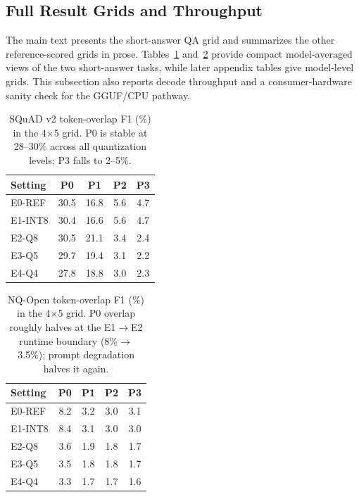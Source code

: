 \documentclass[letterpaper]{article}
\begin{document}
\subsection{Full Result Grids and Throughput}

The main text presents the short-answer QA grid and summarizes the other
reference-scored grids in prose. Tables~\ref{tab:squad_grid}
and~\ref{tab:nq_grid} provide compact model-averaged views of the two
short-answer tasks, while later appendix tables give model-level grids. This
subsection also reports decode throughput and a consumer-hardware sanity check
for the GGUF/CPU pathway.


\begin{table}[t]
  \small\centering
  \caption{SQuAD v2 token-overlap F1 (\%) in the 4$\times$5 grid.
    P0 is stable at 28--30\% across all quantization levels; P3 falls to 2--5\%.}
  \label{tab:squad_grid}
  \begin{tabular}{@{}lcccc@{}}
    \toprule
    Setting & P0 & P1 & P2 & P3 \\
    \midrule
    E0-REF  & 30.5 & 16.8 & 5.6 & 4.7 \\
    E1-INT8 & 30.4 & 16.6 & 5.6 & 4.7 \\
    E2-Q8   & 30.5 & 21.1 & 3.4 & 2.4 \\
    E3-Q5   & 29.7 & 19.4 & 3.1 & 2.2 \\
    E4-Q4   & 27.8 & 18.8 & 3.0 & 2.3 \\
    \bottomrule
  \end{tabular}
\end{table}

\begin{table}[t]
  \small\centering
  \caption{NQ-Open token-overlap F1 (\%) in the 4$\times$5 grid.
    P0 overlap roughly halves at the E1$\to$E2 runtime boundary
    (8\%$\to$3.5\%); prompt degradation halves it again.}
  \label{tab:nq_grid}
  \begin{tabular}{@{}lcccc@{}}
    \toprule
    Setting & P0 & P1 & P2 & P3 \\
    \midrule
    E0-REF  & 8.2 & 3.2 & 3.0 & 3.1 \\
    E1-INT8 & 8.4 & 3.1 & 3.0 & 3.0 \\
    E2-Q8   & 3.6 & 1.9 & 1.8 & 1.7 \\
    E3-Q5   & 3.5 & 1.8 & 1.8 & 1.7 \\
    E4-Q4   & 3.3 & 1.7 & 1.7 & 1.6 \\
    \bottomrule
  \end{tabular}
\end{table}
\end{document}
